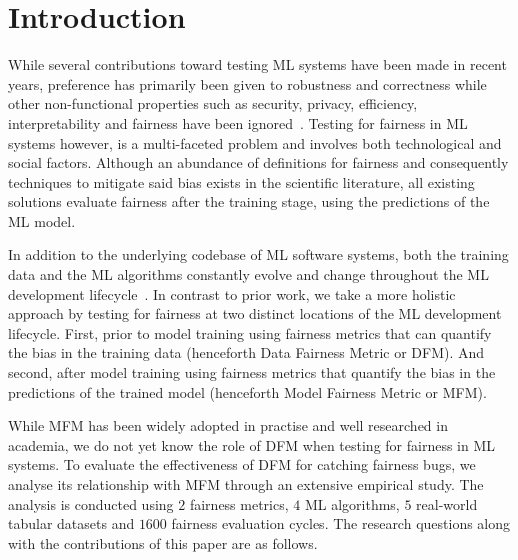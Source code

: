 \documentclass[sigconf,review,anonymous]{acmart}
\begin{document}
\section{Introduction}\label{sec:intro}




While several contributions toward testing ML systems have been made
in recent years, preference has primarily been given to robustness and
correctness while other non-functional properties such as security,
privacy, efficiency, interpretability and fairness have been
ignored \cite{zhang2020machine,zhang2021ignorance,mehrabi2021survey,wan2021modeling}. Testing
for fairness in ML systems however, is a multi-faceted problem and
involves both technological and social factors. Although an abundance
of definitions for fairness and consequently techniques to mitigate
said bias exists in the scientific literature, all existing solutions
evaluate fairness after the training stage, using the predictions of
the ML model.

In addition to the underlying codebase of ML software systems, both
the training data and the ML algorithms constantly evolve and change
throughout the ML development
lifecycle \cite{sculley2015hidden,bosch2021engineering,hutchinson2021towards}. In
contrast to prior work, we take a more holistic approach by testing
for fairness at two distinct locations of the ML development
lifecycle. First, prior to model training using fairness metrics that
can quantify the bias in the training data (henceforth Data Fairness
Metric or DFM). And second, after model training using fairness
metrics that quantify the bias in the predictions of the trained model
(henceforth Model Fairness Metric or MFM).

While MFM has been widely adopted in practise and well researched in
academia, we do not yet know the role of DFM when testing for fairness
in ML systems. To evaluate the effectiveness of DFM for catching
fairness bugs, we analyse its relationship with MFM through an
extensive empirical study. The analysis is conducted using $2$
fairness metrics, $4$ ML algorithms, $5$ real-world tabular datasets
and $1600$ fairness evaluation cycles. The research questions along
with the contributions of this paper are as follows.
\end{document}
